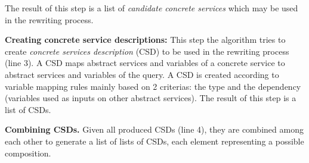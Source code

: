 The result of this step is a list of \textit{candidate concrete services} which
may be used in the rewriting process.


\noindent \textbf{Creating concrete service descriptions:} This step the
 algorithm tries to create \textit{concrete services description} (CSD) to be
 used in the rewriting process (line 3). A CSD maps abstract services and
 variables of a concrete service to abstract services and variables of the
 query. A CSD is created 
according to variable mapping rules mainly based on 2 criterias: the type and the dependency (variables used as inputs on other abstract services). 
The  result of this step is a list of CSDs.
  

 
\noindent \textbf{Combining CSDs.} Given all produced CSDs  (line
4), they are combined among each other to generate  a list of lists of CSDs, each element representing a possible composition.

